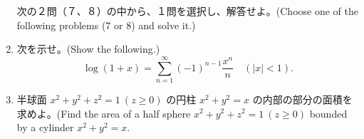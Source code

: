 \begin{enumerate}
\vspace{3ex}
\noindent
次の２問（７、８）の中から、１問を選択し、解答せよ。(Choose one of the following problems (7 or 8) and solve it.)
     
\item 次を示せ。(Show the following.)
$$\log(1+x) = \sum_{n=1}^{\infty}(-1)^{n-1}\frac{x^n}{n} \quad(|x|<1).$$

\item 半球面 $x^2+y^2+z^2 = 1 \:(z\geq 0)$ の円柱 $x^2+y^2 = x$ の内部の部分の面積を求めよ。(Find the area of a half sphere $x^2+y^2+z^2 = 1 \:(z\geq 0)$ bounded by a cylinder $x^2+y^2 = x$. 
\end{enumerate}
     


